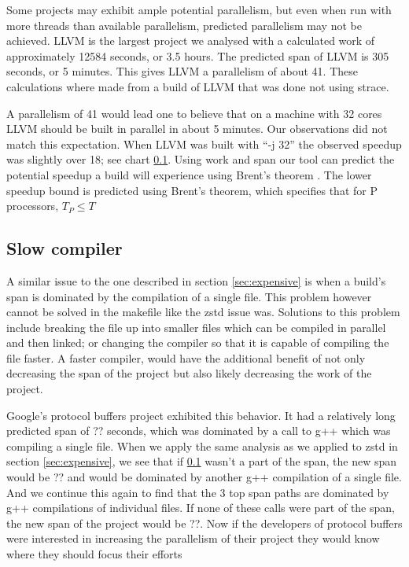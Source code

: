 \documentclass[sigplan,10pt,review,authorversion]{acmart}\settopmatter{printfolios=true,printccs=false,printacmref=false}
\begin{document}
Some projects may exhibit ample potential parallelism, but even when run with more threads than
available parallelism, predicted parallelism may not be achieved.  LLVM \cite{} is the largest
project we analysed with a calculated work of approximately 12584 seconds, or 3.5 hours.  The
predicted span of LLVM is 305 seconds, or 5 minutes.  This gives LLVM a parallelism of about 41.
These calculations where made from a build of LLVM that was done not using strace.

A parallelism of 41 would lead one to believe that on a machine with 32 cores LLVM should be built
in parallel in about 5 minutes.  Our observations did not match this expectation.  When LLVM was
built with ``-j 32'' the observed speedup was slightly over 18; see chart \ref{}.  Using work and
span our tool can predict the potential speedup a build will experience using Brent's theorem
\cite{}.  The lower speedup bound is predicted using Brent's theorem, which specifies that for
P processors, \begin{math} T_P \leq T \end{math}



\subsection{Slow compiler}

A similar issue to the one described in section \ref{sec:expensive} is when a build's
span is dominated by the compilation of a single file.  This problem however cannot be
solved in the makefile like the zstd issue was.  Solutions to this problem include
breaking the file up into smaller files which can be compiled in parallel and then
linked; or changing the compiler so that it is capable of compiling the file faster.
A faster compiler, would have the additional benefit of not only decreasing the span
of the project but also likely decreasing the work of the project.

Google's protocol buffers project \cite{} exhibited this behavior.  It had a relatively
long predicted span of ?? seconds, which was dominated by a call to g++ which was
compiling a single file.  When we apply the same analysis as we applied to zstd in
section \ref{sec:expensive}, we see that if \ref{} wasn't a part of the span, the new
span would be ?? and would be dominated by another g++ compilation of a single file.
And we continue this again to find that the 3 top span paths are dominated by g++
compilations of individual files.  If none of these calls were part of the span, the
new span of the project would be ??.  Now if the developers of protocol buffers were
interested in increasing the parallelism of their project they would know where they
should focus their efforts
\end{document}
